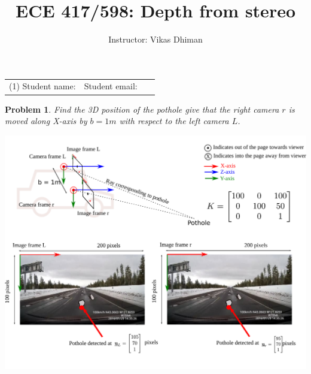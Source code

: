 \documentclass[times,singlecolumn]{article}
\title{ECE 417/598: Depth from stereo}
\author{Instructor: Vikas Dhiman}
\newtheorem{prob}{Problem}
\begin{document}
\maketitle
\begin{tabular}{p{0.5\linewidth}p{0.5\linewidth}}
  (1) Student name:& Student email: \\
\end{tabular}

\begin{prob}
  Find the 3D position of the pothole give that the right camera $r$  is moved
  along X-axis by $b=1m$ with respect to the left camera $L$. 
\end{prob}

\includegraphics[width=\linewidth]{media/image-road-triangulation-ray-ray.pdf}
\end{document}
